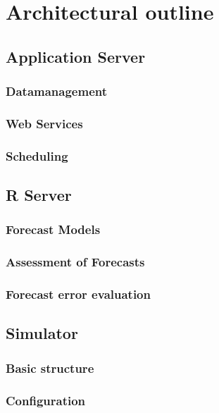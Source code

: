 

\section{Architectural outline}

\subsection{Application Server}

\subsubsection{Datamanagement}

\subsubsection{Web Services}

\subsubsection{Scheduling}


\subsection{R Server}

\subsubsection{Forecast Models}

\subsubsection{Assessment of Forecasts}

\subsubsection{Forecast error evaluation}


\subsection{Simulator}

\subsubsection{Basic structure}

\subsubsection{Configuration}

